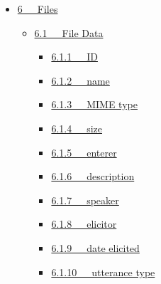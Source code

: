 \documentclass[letterpaper,10pt,english]{sphinxmanual}
\begin{document}
{\begin{minipage}{0.95\linewidth}
\begin{itemize}
\begin{itemize}
\begin{itemize}
\item {} 
{\hyperref[user_guide:history]{5.5.3   history}}

\item {} 
{\hyperref[user_guide:associate]{5.5.4   associate}}

\item {} 
{\hyperref[user_guide:remember]{5.5.5   remember}}

\item {} 
{\hyperref[user_guide:export]{5.5.6   export}}

\item {} 
{\hyperref[user_guide:export-all]{5.5.7   export all}}

\item {} 
{\hyperref[user_guide:remember-all]{5.5.8   remember all}}

\end{itemize}

\end{itemize}

\item {} 
{\hyperref[user_guide:files]{6   Files}}
\begin{itemize}
\item {} 
{\hyperref[user_guide:file-data]{6.1   File Data}}
\begin{itemize}
\item {} 
{\hyperref[user_guide:id1]{6.1.1   ID}}

\item {} 
{\hyperref[user_guide:name]{6.1.2   name}}

\item {} 
{\hyperref[user_guide:mime-type]{6.1.3   MIME type}}

\item {} 
{\hyperref[user_guide:size]{6.1.4   size}}

\item {} 
{\hyperref[user_guide:id2]{6.1.5   enterer}}

\item {} 
{\hyperref[user_guide:description]{6.1.6   description}}

\item {} 
{\hyperref[user_guide:id3]{6.1.7   speaker}}

\item {} 
{\hyperref[user_guide:id4]{6.1.8   elicitor}}

\item {} 
{\hyperref[user_guide:id5]{6.1.9   date elicited}}

\item {} 
{\hyperref[user_guide:utterance-type]{6.1.10   utterance type}}


\end{itemize}
\end{itemize}
\end{itemize}
\end{minipage}}
\end{document}
